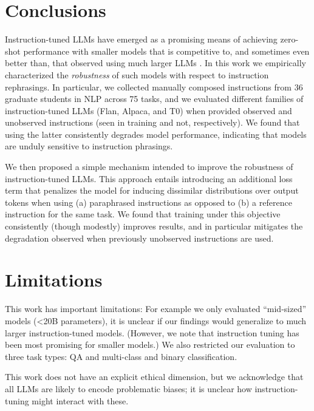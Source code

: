 \section{Conclusions}
\label{section:conclusions}
\vspace{-.35em}

Instruction-tuned LLMs have emerged as a promising means of achieving zero-shot performance with smaller models that is competitive to, and sometimes even better than, that observed using much larger LLMs \cite{longpre2023flan,alpaca}.
In this work we empirically characterized the \emph{robustness} of such models with respect to instruction rephrasings.
In particular, we collected manually composed instructions from 36 graduate students in NLP across 75 tasks, and we evaluated different families of instruction-tuned LLMs (Flan, Alpaca, and T0) when provided observed and unobserved instructions (seen in training and not, respectively). %
We found that using the latter consistently degrades model performance, indicating that models are unduly sensitive to instruction phrasings.

We then proposed a simple mechanism intended to improve the robustness of instruction-tuned LLMs.
This approach entails introducing an additional loss term that penalizes the model for inducing dissimilar distributions over output tokens when using (a) paraphrased instructions as opposed to (b) a reference instruction for the same task.
We found that training under this objective consistently (though modestly) improves results, and in particular mitigates the degradation observed when previously unobserved instructions are used.

\section{Limitations}
\label{section:limitations}
\vspace{-.35em}

This work has important limitations: For example we only evaluated ``mid-sized'' models (<20B parameters), it is unclear if our findings would generalize to much larger instruction-tuned models. (However, we note that instruction tuning has been most promising for smaller models.)
We also restricted our evaluation to three task types: QA and multi-class and binary classification.

\vspace{0.1em}
 This work does not have an explicit ethical dimension, but we acknowledge that all LLMs are likely to encode problematic biases; it is unclear how instruction-tuning might interact with these.

